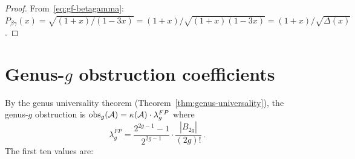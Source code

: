 \begin{proof}
From~\eqref{eq:gf-betagamma}: $P_{\beta\gamma}(x) = \sqrt{(1+x)/(1-3x)} = (1+x)/\sqrt{(1+x)(1-3x)} = (1+x)/\sqrt{\Delta(x)}$.
\end{proof}

\section*{Genus-$g$ obstruction coefficients}
\label{sec:genus-obstruction-table}

By the genus universality theorem
(Theorem~\ref{thm:genus-universality}), the genus-$g$ obstruction
is $\operatorname{obs}_g(\mathcal{A}) = \kappa(\mathcal{A}) \cdot \lambda_g^{FP}$
where
\[
\lambda_g^{FP}
  = \frac{2^{2g-1}-1}{2^{2g-1}} \cdot \frac{|B_{2g}|}{(2g)!}\,.
\]
The first ten values are:

